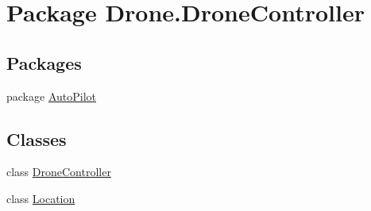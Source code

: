 \hypertarget{namespace_drone_1_1_drone_controller}{}\section{Package Drone.\+Drone\+Controller}
\label{namespace_drone_1_1_drone_controller}
\subsection*{Packages}
\begin{DoxyCompactItemize}
\item 
package \hyperlink{namespace_drone_1_1_drone_controller_1_1_auto_pilot}{Auto\+Pilot}
\end{DoxyCompactItemize}
\subsection*{Classes}
\begin{DoxyCompactItemize}
\item 
class \hyperlink{class_drone_1_1_drone_controller_1_1_drone_controller}{Drone\+Controller}
\item 
class \hyperlink{class_drone_1_1_drone_controller_1_1_location}{Location}
\end{DoxyCompactItemize}
